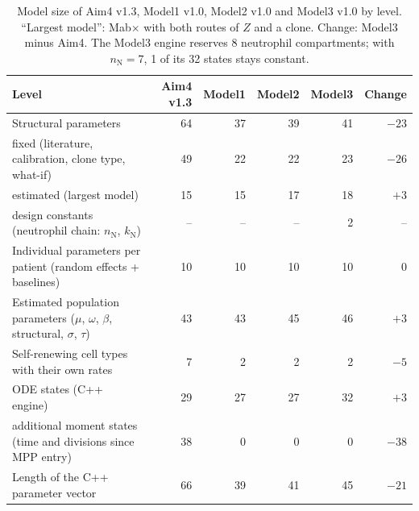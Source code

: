 \begin{table}[!htbp]
\centering
\small
\setlength{\tabcolsep}{3.5pt}
\caption{Model size of Aim4 v1.3, Model1 v1.0, Model2 v1.0 and Model3 v1.0 by level. ``Largest model'': Mab$\times$ with both routes of $Z$ and a clone. Change: Model3 minus Aim4. The Model3 engine reserves 8 neutrophil compartments; with $n_{\mathrm{N}}=7$, 1 of its 32 states stays constant.}
\label{tab:levels}
\begin{tabular}{>{\raggedright\arraybackslash}p{8.7cm}rrrrr}
\toprule
Level & Aim4 v1.3 & Model1 & Model2 & Model3 & Change \\
\midrule
Structural parameters & 64 & 37 & 39 & 41 & $-23$ \\
\quad fixed (literature, calibration, clone type, what-if) & 49 & 22 & 22 & 23 & $-26$ \\
\quad estimated (largest model) & 15 & 15 & 17 & 18 & $+3$ \\
\quad design constants (neutrophil chain: $n_{\mathrm{N}}$, $k_{\mathrm{N}}$) & -- & -- & -- & 2 & -- \\
Individual parameters per patient (random effects + baselines) & 10 & 10 & 10 & 10 & 0 \\
Estimated population parameters ($\mu$, $\omega$, $\beta$, structural, $\sigma$, $\tau$) & 43 & 43 & 45 & 46 & $+3$ \\
Self-renewing cell types with their own rates & 7 & 2 & 2 & 2 & $-5$ \\
ODE states (C++ engine) & 29 & 27 & 27 & 32 & $+3$ \\
\quad additional moment states (time and divisions since MPP entry) & 38 & 0 & 0 & 0 & $-38$ \\
Length of the C++ parameter vector & 66 & 39 & 41 & 45 & $-21$ \\
\bottomrule
\end{tabular}
\end{table}
